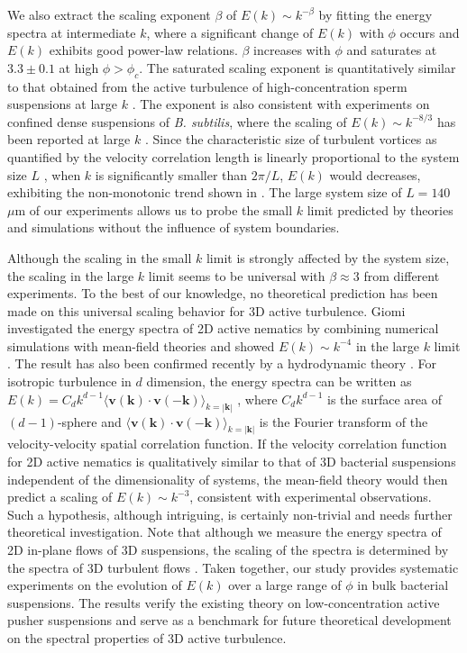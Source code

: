 \documentclass[twocolumn,aps,prx,amsmath,amssymb,longbibliography]{revtex4-2}
\begin{document}
We also extract the scaling exponent $\beta$ of $E(k) \sim k^{-\beta}$ by fitting the energy spectra at intermediate $k$, where a significant change of $E(k)$ with $\phi$ occurs and $E(k)$ exhibits good power-law relations. $\beta$ increases with $\phi$ and saturates at $3.3 \pm 0.1$ at high $\phi > \phi_c$. The saturated scaling exponent is quantitatively similar to that obtained from the active turbulence of high-concentration sperm suspensions at large $k$ \cite{Creppy2015}.
The exponent is also consistent with experiments on confined dense suspensions of \textit{B. subtilis}, where the scaling of $E(k) \sim k^{-8/3}$ has been reported at large $k$ \cite{Wensink2012}.
Since the characteristic size of turbulent vortices as quantified by the velocity correlation length is linearly proportional to the system size $L$ \cite{Guo2018}, when $k$ is significantly smaller than $2\pi/L$, $E(k)$ would decreases, exhibiting the non-monotonic trend shown in \cite{Wensink2012}. The large system size of $L = 140$ $\mu$m of our experiments allows us to probe the small $k$ limit predicted by theories and simulations without the influence of system boundaries.

Although the scaling in the small $k$ limit is strongly affected by the system size, the scaling in the large $k$ limit seems to be universal with $\beta \approx 3$ from different experiments. To the best of our knowledge, no theoretical prediction has been made on this universal scaling behavior for 3D active turbulence. Giomi investigated the energy spectra of 2D active nematics by combining numerical simulations with mean-field theories and showed $E(k) \sim k^{-4}$ in the large $k$ limit \cite{Giomi2015}.
The result has also been confirmed recently by a hydrodynamic theory \cite{Alert2020}. For isotropic turbulence in $d$ dimension, the energy spectra can be written as $E(k) = C_d k^{d-1} \langle \mathbf{v}(\mathbf{k})\cdot \mathbf{v}(-\mathbf{k})\rangle_{k = |\mathbf{k}|}$ \cite{Wensink2012,Bardfalvy2019},
where $C_d k^{d-1}$ is the surface area of $(d-1)$-sphere and $\langle \mathbf{v}(\mathbf{k})\cdot \mathbf{v}(-\mathbf{k})\rangle_{k = |\mathbf{k}|}$ is the Fourier transform of the velocity-velocity spatial correlation function. If the velocity correlation function for 2D active nematics is qualitatively similar to that of 3D bacterial suspensions independent of the dimensionality of systems, the mean-field theory would then predict a scaling of $E(k) \sim k^{-3}$, consistent with experimental observations. Such a hypothesis, although intriguing, is certainly non-trivial and needs further theoretical investigation. Note that although we measure the energy spectra of 2D in-plane flows of 3D suspensions, the scaling of the spectra is determined by the spectra of 3D turbulent flows \cite{Pope2000}. Taken together, our study provides systematic experiments on the evolution of $E(k)$ over a large range of $\phi$ in bulk bacterial suspensions. The results verify the existing theory on low-concentration active pusher suspensions and serve as a benchmark for future theoretical development on the spectral properties of 3D active turbulence.
\end{document}
